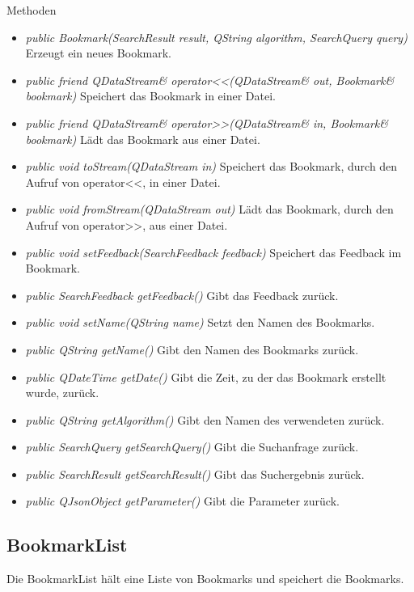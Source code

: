 Methoden
\begin{itemize}
\item \textit{public Bookmark(SearchResult result, QString algorithm, SearchQuery query)} Erzeugt ein neues Bookmark.
\item \textit{public friend QDataStream\& operator<<(QDataStream\& out, Bookmark\& bookmark)} Speichert das Bookmark in einer Datei.
\item \textit{public friend QDataStream\& operator>>(QDataStream\& in, Bookmark\& bookmark)} Lädt das Bookmark aus einer Datei.
\item \textit{public void toStream(QDataStream in)} Speichert das Bookmark, durch den Aufruf von operator<<, in einer Datei.
\item \textit{public void fromStream(QDataStream out)} Lädt das Bookmark, durch den Aufruf von operator>>, aus einer Datei.
\item\textit{public void setFeedback(SearchFeedback feedback)} Speichert das Feedback im Bookmark.
\item\textit{public SearchFeedback getFeedback()} Gibt das Feedback zurück.
\item\textit{public void setName(QString name)} Setzt den Namen des Bookmarks.
\item\textit{public QString getName()} Gibt den Namen des Bookmarks zurück.
\item\textit{public QDateTime getDate()} Gibt die Zeit, zu der das Bookmark erstellt wurde, zurück.
\item\textit{public QString getAlgorithm()} Gibt den Namen des verwendeten  zurück.
\item\textit{public SearchQuery getSearchQuery()} Gibt die Suchanfrage zurück.
\item\textit{public SearchResult getSearchResult()} Gibt das Suchergebnis zurück.
\item\textit{public QJsonObject getParameter()} Gibt die Parameter zurück.
\end{itemize}

\subsection*{BookmarkList}
Die BookmarkList hält eine Liste von Bookmarks und speichert die Bookmarks.

